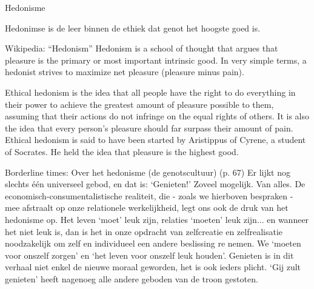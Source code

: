 \documentclass[main.tex]{subfiles}
\begin{document}
\begin{examenvraag}
    \begin{vraag}
        Hedonisme
    \end{vraag}

    \begin{antwoord}
        Hedonimse is de leer binnen de ethiek dat genot het hoogste goed is.
        \begin{citaat}{Wikipedia: ``Hedonism''}
            Hedonism is a school of thought that argues that pleasure is the primary or most important intrinsic good. In very simple terms, a hedonist strives to maximize net pleasure (pleasure minus pain).

            Ethical hedonism is the idea that all people have the right to do everything in their power to achieve the greatest amount of pleasure possible to them, assuming that their actions do not infringe on the equal rights of others.
            It is also the idea that every person's pleasure should far surpass their amount of pain.
            Ethical hedonism is said to have been started by Aristippus of Cyrene, a student of Socrates.
            He held the idea that pleasure is the highest good.
        \end{citaat}
        \begin{citaat}{Borderline times: Over het hedonisme (de genotscultuur) (p. 67)}
            Er lijkt nog slechts één universeel gebod, en dat is: ‘Genieten!’ Zoveel mogelijk.
            Van alles.
            De economisch-consumentalistische realiteit, die - zoals we hierboven bespraken - mee afstraalt op onze relationele werkelijkheid, legt ons ook de druk van het hedonisme op.
            Het leven ‘moet’ leuk zijn, relaties ‘moeten’ leuk zijn... en wanneer het niet leuk is, dan is het in onze opdracht van zelfcreatie en zelfrealisatie noodzakelijk om zelf en individueel een andere beslissing re nemen.
            We ‘moeten voor onszelf zorgen’ en ‘het leven voor onszelf leuk houden’.
            Genieten is in dit verhaal niet enkel de nieuwe moraal geworden, het is ook ieders plicht.
            ‘Gij zult genieten’ heeft nagenoeg alle andere geboden van de troon gestoten.
        \end{citaat}
    \end{antwoord}
\end{examenvraag}
\end{document}
